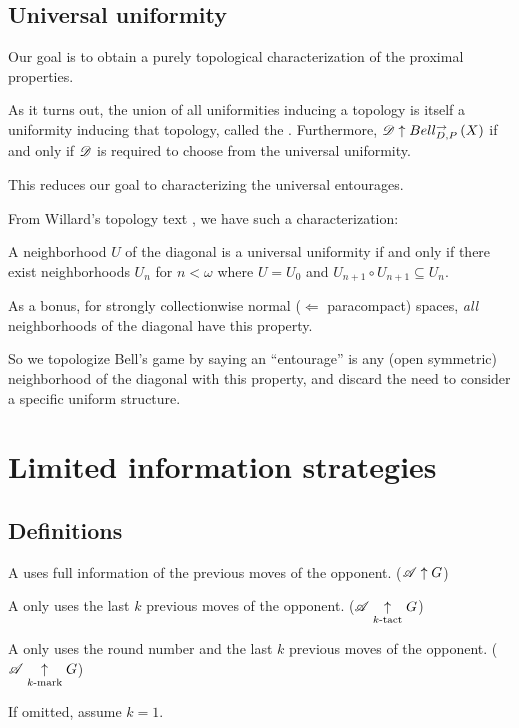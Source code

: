 \documentclass{beamer}
\theoremstyle{definition}
\begin{document}
\subsection{Universal uniformity}

\begin{frame}
  Our goal is to obtain a purely topological characterization of the
  proximal properties.

  \vpause

  As it turns out, the union of all uniformities inducing a topology is
  itself a uniformity inducing that topology, called the
  . Furthermore, $\mathscr{D}\uparrow Bell_{D,P}^{\to}\left({X}\right)$
  if and only if $\mathscr{D}$ is required to choose from the universal uniformity.

  \vpause

  This reduces our goal to characterizing the universal entourages.
\end{frame}

\begin{frame}
  From Willard's topology text \cite{MR2048350}, we have such
  a characterization:

  \begin{theorem}
    A neighborhood $U$ of the diagonal is a universal uniformity if
    and only if there
    exist neighborhoods $U_n$ for $n<\omega$ where $U=U_0$ and
    $U_{n+1}\circ U_{n+1}\subseteq U_n$.
  \end{theorem}

  \pause

  As a bonus, for strongly collectionwise normal
  ($\Leftarrow$ paracompact) spaces, \textit{all} neighborhoods of
  the diagonal have this property.

  \vpause

  So we topologize Bell's game by
  saying an ``entourage'' is any (open symmetric) neighborhood of the
  diagonal with this property, and discard the need to consider a
  specific uniform structure.
\end{frame}


\section{Limited information strategies}

\subsection{Definitions}

\begin{frame}
  A  uses full information of the
  previous moves of the opponent. ($\mathscr{A}\uparrow G$)

  \vpause
  A  only uses the last $k$
  previous moves of the opponent. ($\mathscr{A}\underset{k\text{-tact}}{\uparrow} G$)

  \vpause
  A  only uses the round number and the last $k$
  previous moves of the opponent. ($\mathscr{A}\underset{k\text{-mark}}{\uparrow} G$)

  \vpause
  If omitted, assume $k=1$.
\end{frame}
\end{document}
